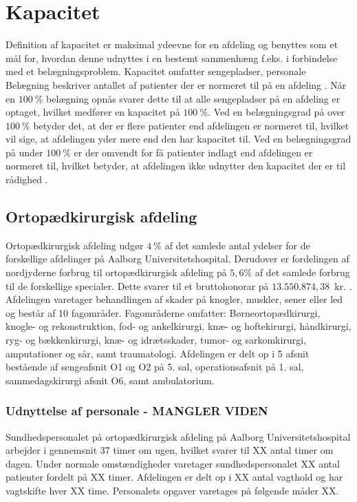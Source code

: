\section{Kapacitet}
Definition af kapacitet er maksimal ydeevne for en afdeling og benyttes som et mål for, hvordan denne udnyttes i en bestemt sammenhæng f.eks. i forbindelse med et belægningsproblem. Kapacitet omfatter sengepladser, personale 
Belægning beskriver antallet af patienter der er normeret til på en afdeling \cite{Heidmann2014}. Når en $100~\%$ belægning opnås svarer dette til at alle sengepladser på en afdeling er optaget, hvilket medfører en kapacitet på $100~\%$. Ved en belægningsgrad på over $100~\%$ betyder det, at der er flere patienter end afdelingen er normeret til, hvilket vil sige, at afdelingen yder mere end den har kapacitet til. Ved en belægningsgrad på under $100~\%$ er der omvendt for få patienter indlagt end afdelingen er normeret til, hvilket betyder, at afdelingen ikke udnytter den kapacitet der er til rådighed . 

\subsection{Ortopædkirurgisk afdeling}
Ortopædkirurgisk afdeling udgør $4~\%$ af det samlede antal ydelser for de forskellige afdelinger på Aalborg Universitetshospital. Derudover er fordelingen af nordjyderne forbrug til ortopædkirurgisk afdeling på $5,6\%$ af det samlede forbrug til de forskellige specialer. Dette svarer til et bruttohonorar på $13.550.874,38$~kr. \cite{RegionNord2016}. Afdelingen varetager behandlingen af skader på knogler, muskler, sener eller led og består af 10 fagområder. Fagområderne omfatter: Børneortopædkirurgi, knogle- og rekonstruktion, fod- og ankelkirurgi, knæ- og hoftekirurgi, håndkirurgi, ryg- og bækkenkirurgi, knæ- og idrætsskader, tumor- og sarkomkirurgi, amputationer og sår, samt traumatologi. Afdelingen er delt op i 5 afsnit bestående af sengeafsnit O1 og O2 på 5. sal, operationsafsnit på 1. sal, sammedagskirurgi afsnit O6, samt ambulatorium. \cite{Aalborg2016}


\subsubsection{Udnyttelse af personale - MANGLER VIDEN} 
Sundhedspersonalet på ortopædkirurgisk afdeling på Aalborg Universitetshospital arbejder i gennemsnit 37 timer om ugen, hvilket svarer til XX antal timer om dagen. Under normale omstændigheder varetager sundhedspersonalet XX antal patienter fordelt på XX timer. \cite{Danske2015} Afdelingen er delt op i XX antal vagthold og har vagtskifte hver XX time. Personalets opgaver varetages på følgende måder XX.

